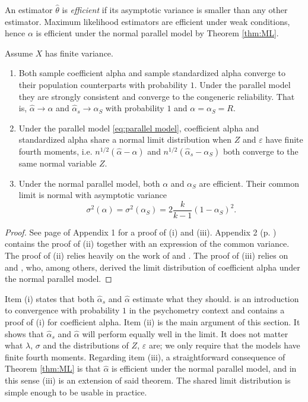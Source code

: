 \documentclass[twoside]{article}
\begin{document}
An estimator $\hat{\theta}$ is \textit{efficient} \citep[][Section 4.3]{Lehmann2004-ke} if its asymptotic variance is smaller than any other estimator. Maximum likelihood estimators are efficient under weak conditions, hence $\alpha$ is efficient under the normal parallel model by Theorem \ref{thm:ML}.  

\begin{thm}
\label{thm:asymptotics}
Assume $X$ has finite variance. 
\begin{enumerate}[label=(\roman*)]
    \item Both sample coefficient alpha and sample standardized alpha converge to their population counterparts with probability $1$. Under the parallel model they are strongly consistent and converge to the congeneric reliability. That is, $\hat{\alpha}\to\alpha$ and $\hat{\alpha}_s\to\alpha_S$ with probability $1$ and $\alpha = \alpha_S =  R$.
    \item Under the parallel model \eqref{eq:parallel model}, coefficient alpha and standardized alpha share a normal limit distribution when $Z$ and $\varepsilon$ have finite fourth moments, i.e. $n^{1/2}(\hat{\alpha} - \alpha)$ and  $n^{1/2}(\hat{\alpha}_s - \alpha_S)$ both converge to the same normal variable $Z$.
    \item Under the normal parallel model, both $\alpha$ and $\alpha_S$ are efficient. Their common limit is normal with asymptotic variance 
    $$\sigma^{2}(\alpha)= \sigma^{2}(\alpha_S)=2\frac{k}{k-1}(1-\alpha_S)^{2}.$$
\end{enumerate}
\end{thm}    
\begin{proof}
See page \pageref{proof:asymptotics} of Appendix 1 for a proof of (i) and (iii). Appendix 2 (p. \pageref{Appendix 2}) contains the proof of (ii) together with an expression of the common variance. The proof of (ii) relies heavily on the work of \citet{Van_Zyl2000-si} and \citet{hayashi2005note}. The proof of (iii) relies on \citet[][eq. 13]{Van_Zyl2000-si} and \citet[][eq. 58]{Kristof1963-tb}, who, among others, derived the limit distribution of coefficient alpha under the normal parallel model.
\end{proof}

\begin{rem}
Item (i) states that both $\hat{\alpha}_s$ and $\hat{\alpha}$ estimate what they should. \citet{Raykov2019-tv} is an introduction to convergence with probability $1$ in the psychometry context and contains a proof of (i) for coefficient alpha. Item (ii) is the main argument of this section. It shows that $\hat{\alpha}_{s}$ and $\hat{\alpha}$ will perform equally well in the limit. It does not matter what $\lambda$, $\sigma$ and the distributions of $Z$, $\varepsilon$ are; we only require that the models have finite fourth moments. Regarding item (iii), a straightforward consequence of Theorem \ref{thm:ML} is that $\hat{\alpha}$ is efficient under the normal parallel model, and in this sense (iii) is an extension of said theorem. The shared limit distribution is simple enough to be usable in practice.
\end{rem}
\end{document}
